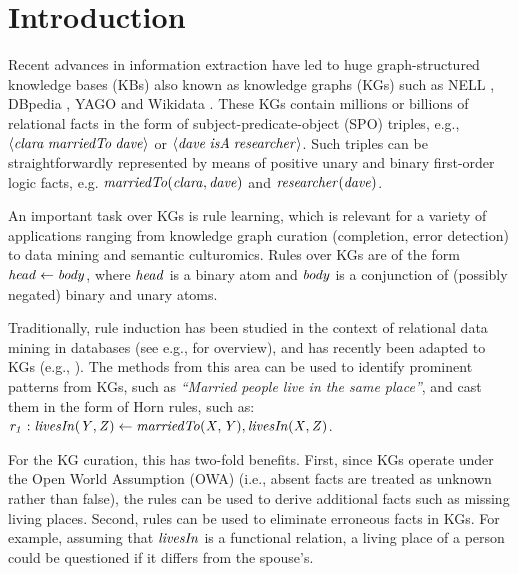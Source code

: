 \section{Introduction}
\label{sec:intro}

Recent advances in information extraction have led to
huge graph-structured knowledge bases (KBs) also known as knowledge graphs (KGs) such as NELL \cite{nell}, DBpedia \cite{dbpedia}, YAGO \cite{yago} and Wikidata \cite{wikidata}. These KGs contain millions or billions of relational facts in the form of subject-predicate-object (SPO) triples, e.g., $\langle\mathit{clara\;marriedTo\;dave}\rangle$ or $\langle\mathit{dave\;isA\;researcher}\rangle$. Such triples can be straightforwardly represented by means of positive unary and binary first-order logic facts, e.g. $\mathit{marriedTo(clara,dave)}$ and $\mathit{researcher(dave)}$.

An important task over KGs is rule learning, which is relevant for a variety of applications ranging from knowledge graph curation (completion, error detection) \cite{DBLP:journals/semweb/Paulheim17} to data mining and semantic culturomics. Rules over KGs are of the form $\mathit{head \leftarrow body}$, where $\mathit{head}$ is a binary atom and $\mathit{body}$ is a conjunction of (possibly negated) binary and unary atoms. 

Traditionally, rule induction has been studied in the context of relational data mining in databases (see e.g., \cite{DBLP:books/daglib/0021868} for overview), and has recently been adapted to KGs (e.g., \cite{amie,op,rdf2rules}). The methods from this area can be used to identify prominent patterns from KGs, such as \emph{``Married people live in the same
place''}, and cast them in the form of Horn rules, such as:
$\mathit{r_1:\;}\mathit{livesIn(Y,Z)}\leftarrow \mathit{marriedTo(X,Y),livesIn(X,Z)}$. 

For the KG curation, this has two-fold benefits. First, since KGs operate under the Open World
Assumption (OWA) (i.e., absent facts are treated as unknown rather than false),
the rules can be used to derive additional facts such as missing living places. %
Second, rules can be used to eliminate erroneous facts in KGs. For example, assuming that $\mathit{livesIn}$ is a functional relation, %
a living place of a person could be questioned if it differs from the spouse's.

